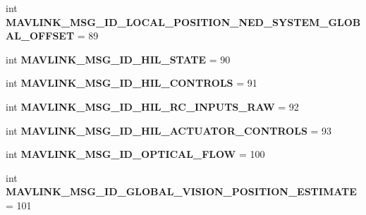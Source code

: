 \begin{DoxyCompactItemize}
\mbox{\label{namespacepymavlink_1_1dialects_1_1v10_a0e7146b2fb06400d3bfb98a110e5819d}} 
int {\bfseries M\+A\+V\+L\+I\+N\+K\+\_\+\+M\+S\+G\+\_\+\+I\+D\+\_\+\+L\+O\+C\+A\+L\+\_\+\+P\+O\+S\+I\+T\+I\+O\+N\+\_\+\+N\+E\+D\+\_\+\+S\+Y\+S\+T\+E\+M\+\_\+\+G\+L\+O\+B\+A\+L\+\_\+\+O\+F\+F\+S\+ET} = 89
\item 
\mbox{\label{namespacepymavlink_1_1dialects_1_1v10_aec0a6ded0cbb851a1404ab442ee1b6c2}} 
int {\bfseries M\+A\+V\+L\+I\+N\+K\+\_\+\+M\+S\+G\+\_\+\+I\+D\+\_\+\+H\+I\+L\+\_\+\+S\+T\+A\+TE} = 90
\item 
\mbox{\label{namespacepymavlink_1_1dialects_1_1v10_af4e60b092e63f319210fdcb0e5e992b9}} 
int {\bfseries M\+A\+V\+L\+I\+N\+K\+\_\+\+M\+S\+G\+\_\+\+I\+D\+\_\+\+H\+I\+L\+\_\+\+C\+O\+N\+T\+R\+O\+LS} = 91
\item 
\mbox{\label{namespacepymavlink_1_1dialects_1_1v10_a71ab7ae1d0750cd4fe448e0903ef1ce9}} 
int {\bfseries M\+A\+V\+L\+I\+N\+K\+\_\+\+M\+S\+G\+\_\+\+I\+D\+\_\+\+H\+I\+L\+\_\+\+R\+C\+\_\+\+I\+N\+P\+U\+T\+S\+\_\+\+R\+AW} = 92
\item 
\mbox{\label{namespacepymavlink_1_1dialects_1_1v10_a07b1ab16574ed3e8c8ee711cbcc212e0}} 
int {\bfseries M\+A\+V\+L\+I\+N\+K\+\_\+\+M\+S\+G\+\_\+\+I\+D\+\_\+\+H\+I\+L\+\_\+\+A\+C\+T\+U\+A\+T\+O\+R\+\_\+\+C\+O\+N\+T\+R\+O\+LS} = 93
\item 
\mbox{\label{namespacepymavlink_1_1dialects_1_1v10_a85b555f21f0983c4328bb2bc95af197d}} 
int {\bfseries M\+A\+V\+L\+I\+N\+K\+\_\+\+M\+S\+G\+\_\+\+I\+D\+\_\+\+O\+P\+T\+I\+C\+A\+L\+\_\+\+F\+L\+OW} = 100
\item 
\mbox{\label{namespacepymavlink_1_1dialects_1_1v10_ab5f8004ea835197bdefb228661e97dcb}} 
int {\bfseries M\+A\+V\+L\+I\+N\+K\+\_\+\+M\+S\+G\+\_\+\+I\+D\+\_\+\+G\+L\+O\+B\+A\+L\+\_\+\+V\+I\+S\+I\+O\+N\+\_\+\+P\+O\+S\+I\+T\+I\+O\+N\+\_\+\+E\+S\+T\+I\+M\+A\+TE} = 101
\item 
\mbox{\label{namespacepymavlink_1_1dialects_1_1v10_a4c2b774d14f0352d798524f5eba78e9b}} 

\end{DoxyCompactItemize}
